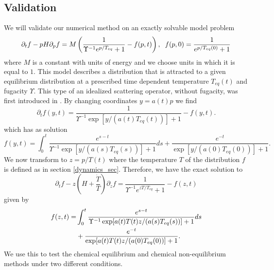 \subsection{Validation}\label{validation}
We will validate our numerical method on an exactly solvable model problem
\begin{equation}\label{toy_eq}
\partial_t f-pH \partial_p f=M\left(\frac{1}{\Upsilon^{-1}e^{p/T_{eq}}+1}-f(p,t)\right), \hspace{2mm} f(p,0)=\frac{1}{e^{p/T_{eq}(0)}+1}
\end{equation}
where $M$ is a constant with units of energy and we choose units in which it is equal to $1$. This model describes a distribution that is attracted to a given equilibrium distribution at a prescribed time dependent temperature $T_{eq}(t)$ and fugacity $\Upsilon$. This type of an idealized scattering operator, without fugacity, was first introduced in \cite{Anderson_Witting}. By changing coordinates $y=a(t)p$ we find
\begin{equation}\label{free_stream_toy}
\partial_tf(y,t)=\frac{1}{\Upsilon^{-1}\exp[y/(a(t)T_{eq}(t))]+1}-f(y,t).
\end{equation}
 which has as solution
\begin{equation}\label{exact_sol}
f(y,t)=\int_0^t\frac{e^{s-t}}{\Upsilon^{-1}\exp[y/(a(s)T_{eq}(s))]+1}ds+\frac{e^{-t}}{\exp[y/(a(0)T_{eq}(0))]+1}.
\end{equation}
We now transform to $z=p/T(t)$ where the temperature $T$ of the distribution $f$ is defined as in section \ref{dynamics_sec}.  Therefore, we have the exact solution to
\begin{equation}\label{k_eq_toy}
\partial_tf-z\left(H+\frac{\dot{T}}{T}\right)\partial_zf=\frac{1}{\Upsilon^{-1}e^{zT/T_{eq}}+1}-f(z,t)
\end{equation}
given by
\begin{align}
f(z,t)=&\int_0^t\frac{e^{s-t}}{\Upsilon^{-1}\exp[a(t)T(t)z/(a(s)T_{eq}(s))]+1}ds\\
&+\frac{e^{-t}}{\exp[a(t)T(t)z/(a(0)T_{eq}(0))]+1}.\notag
\end{align}
We use this to test the chemical equilibrium and chemical non-equilibrium methods under two different conditions. 

